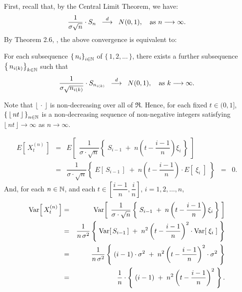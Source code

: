 \begin{enumerate}
		First, recall that, by the Central Limit Theorem, we have:
		\begin{equation*}
		\dfrac{1}{\sigma\sqrt{n}} \cdot S_{n}
		\;\; \overset{d}{\longrightarrow} \;\;
		N(0,1),
		\quad
		\textnormal{as $n \longrightarrow \infty$}.
		\end{equation*}
		By Theorem 2.6, \cite{Billingsley1999}, the above convergence is equivalent to:
		\begin{center}
		For each subsequence $\left\{\,n_{i}\right\}_{i\in\mathbb{N}}$ of $\{\,1,2,\ldots\,\}$, there exists a further subsequence
		$\left\{\,n_{i(k)}\right\}_{k\in\mathbb{N}}$ such that
		\begin{equation*}
		\dfrac{1}{\sigma\sqrt{n_{i(k)}}} \cdot S_{n_{i(k)}}
		\;\; \overset{d}{\longrightarrow} \;\;
		N(0,1),
		\quad
		\textnormal{as $k \longrightarrow \infty$}.
		\end{equation*}		
		\end{center}
		Note that $\lfloor\,\cdot\,\rfloor$ is non-decreasing over all of $\Re$.
		Hence, for each fixed $t \in (0,1]$, $\left\{\,\lfloor\,nt\,\rfloor\,\right\}_{n\in\mathbb{N}}$
		is a non-decreasing sequence of non-negative integers satisfying
		$\lfloor\,nt\,\rfloor \longrightarrow \infty$ as $n \longrightarrow \infty$.

\end{enumerate}

		\begin{eqnarray*}
		E\!\left[\,X^{(n)}_{t}\,\right]
		&=&
		E\!\left[\;\,
		\dfrac{1}{\sigma\cdot\sqrt{n}}
		\left\{\;
		S_{i-1} \;+\; n\left(t - \dfrac{i-1}{n}\right)\xi_{i}
		\,\right\}
		\;\right]
		\\
		& = &
		\dfrac{1}{\sigma\cdot\sqrt{n}}
		\left\{\;
		E\!\left[\, S_{i-1}\,\right] \;+\; n\left(t - \dfrac{i-1}{n}\right)\cdot E\!\left[\;\xi_{i}\;\right]
		\;\right\}
		\;\; = \;\; 0.
		\end{eqnarray*}
		And, for each $n \in \mathbb{N}$, and each $t \in \left[\dfrac{i-1}{n},\dfrac{i}{n}\right]$, $i = 1,2,\ldots,n$, 
		\begin{eqnarray*}
		\textnormal{Var}\!\left[\,X^{(n)}_{t}\,\right]
		&=&
		\textnormal{Var}\!\left[\;\,
		\dfrac{1}{\sigma\cdot\sqrt{n}}
		\left\{\;
		S_{i-1} \;+\; n\left(t - \dfrac{i-1}{n}\right)\xi_{i}
		\,\right\}
		\;\right]
		\\
		& = &
		\dfrac{1}{n\,\sigma^{2}}
		\left\{\;
		\textnormal{Var}\!\left[\, S_{i-1}\,\right] \;+\; n^{2}\left(t - \dfrac{i-1}{n}\right)^{2}\cdot \textnormal{Var}\!\left[\;\xi_{i}\;\right]
		\;\right\}
		\\
		& = &
		\dfrac{1}{n\,\sigma^{2}}
		\left\{\;
		(i-1)\cdot\sigma^{2} \;+\; n^{2}\left(t - \dfrac{i-1}{n}\right)^{2}\cdot\sigma^{2}
		\;\right\}
		\\
		& = &
		\dfrac{1}{n}\cdot
		\left\{\;
		(i-1) \;+\; n^{2}\left(t - \dfrac{i-1}{n}\right)^{2}
		\;\right\}.
		\end{eqnarray*}

